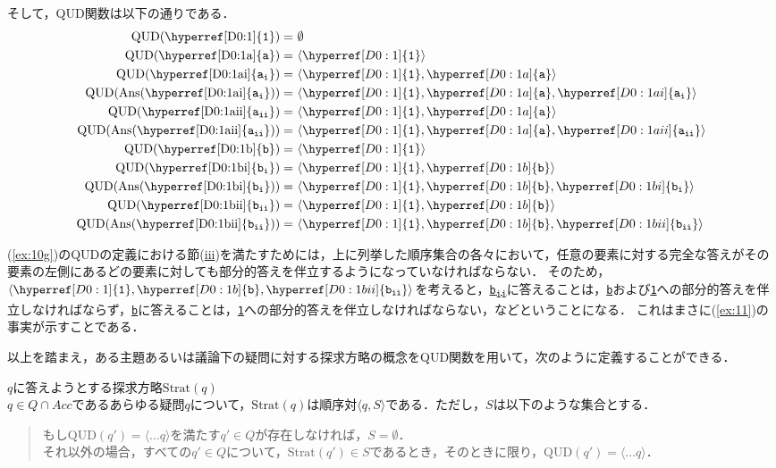\documentclass{goken}
\newcommand{\disref}[2]{\hyperref[#1]{\texttt{#2}}}
\newcommand{\disrefsub}[3]{\hyperref[#1]{\texttt{#2\textsubscript{#3}}}}
\newcommand{\ori}[1]{\noindent\textcolor[gray]{0.7}{\fontsize{8pt}{8pt}\selectfont{\textsf{(p.~#1)}}} }
\begin{document}
\noindent
\ori{18}
そして，QUD関数は以下の通りである．
%
\begin{align*}
	\text{QUD(\disref{D0:1}{1})} =&\ \emptyset \\
	\text{QUD(\disref{D0:1a}{a})} =&\ \langle \disref{D0:1}{1} \rangle \\
	\text{QUD(\disrefsub{D0:1ai}{a}{i})} =&\ \langle \disref{D0:1}{1}, \disref{D0:1a}{a} \rangle \\
	\text{QUD(Ans(\disrefsub{D0:1ai}{a}{i}))} =&\ \langle \disref{D0:1}{1},\disref{D0:1a}{a}, \disrefsub{D0:1ai}{a}{i} \rangle \\
	\text{QUD(\disrefsub{D0:1aii}{a}{ii})} =&\ \langle \disref{D0:1}{1}, \disref{D0:1a}{a} \rangle \\
	\text{QUD(Ans(\disrefsub{D0:1aii}{a}{ii}))} =&\ \langle \disref{D0:1}{1},\disref{D0:1a}{a}, \disrefsub{D0:1aii}{a}{ii} \rangle \\
	\text{QUD(\disref{D0:1b}{b})} =&\ \langle \disref{D0:1}{1} \rangle \\
	\text{QUD(\disrefsub{D0:1bi}{b}{i})} =&\ \langle \disref{D0:1}{1}, \disref{D0:1b}{b} \rangle \\
	\text{QUD(Ans(\disrefsub{D0:1bi}{b}{i}))} =&\ \langle \disref{D0:1}{1},\disref{D0:1b}{b}, \disrefsub{D0:1bi}{b}{i} \rangle \\
	\text{QUD(\disrefsub{D0:1bii}{b}{ii})} =&\ \langle \disref{D0:1}{1}, \disref{D0:1b}{b} \rangle \\
	\text{QUD(Ans(\disrefsub{D0:1bii}{b}{ii}))} =&\ \langle \disref{D0:1}{1},\disref{D0:1b}{b}, \disrefsub{D0:1bii}{b}{ii} \rangle
\end{align*}

\noindent
(\ref{ex:10g})のQUDの定義における節(\hyperref[ex:10giii]{iii})を満たすためには，上に列挙した順序集合の各々において，任意の要素に対する完全な答えがその要素の左側にあるどの要素に対しても部分的答えを伴立するようになっていなければならない．
そのため，$\langle \disref{D0:1}{1},\disref{D0:1b}{b}, \disrefsub{D0:1bii}{b}{ii} \rangle$を考えると，\disrefsub{D0:1bii}{b}{ii}に答えることは，\disref{D0:1b}{b}および\disref{D0:1}{1}への部分的答えを伴立しなければならず，\disref{D0:1b}{b}に答えることは，\disref{D0:1}{1}への部分的答えを伴立しなければならない，などということになる．
これはまさに(\ref{ex:11})の事実が示すことである．

以上を踏まえ，ある主題あるいは議論下の疑問に対する探求方略の概念をQUD関数を用いて，次のように定義することができる．

\begin{exe}
	\ex\label{ex:12} $q$に答えようとする\textsf{探求方略}$\text{Strat}(q)$\\
%
	$q \in Q \cap Acc$であるあらゆる疑問$q$について，$\text{Strat}(q)$は順序対$\langle q, S \rangle$である．ただし，$S$は以下のような集合とする．
	\begin{quote}
		もし$\text{QUD}(q') = \langle \dots q \rangle$を満たす$q' \in Q$が存在しなければ，$S = \emptyset$．\\
		それ以外の場合，すべての$q' \in Q$について，$\text{Strat}(q') \in S$であるとき，そのときに限り，$\text{QUD}(q') = \langle \dots q \rangle$．
	\end{quote}
\end{exe}
\end{document}
